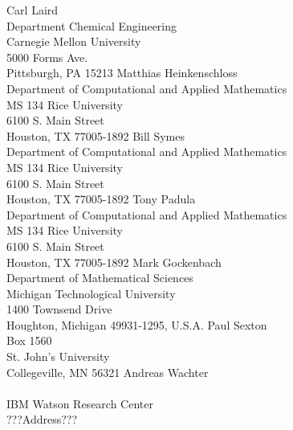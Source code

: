 \documentclass[pdf,ps2pdf,11pt]{SANDreport}
\begin{document}
\begin{SANDdistribution}
 Carl Laird \\ Department Chemical Engineering\\Carnegie Mellon University\\5000 Forms Ave.\\Pittsburgh, PA 15213
 Matthias Heinkenschloss \\ Department of Computational and Applied Mathematics\\MS 134 Rice University\\
6100 S. Main Street\\Houston, TX 77005-1892
 Bill Symes\\Department of Computational and Applied Mathematics\\MS 134 Rice University\\
6100 S. Main Street\\Houston, TX 77005-1892
 Tony Padula\\Department of Computational and Applied Mathematics\\MS 134 Rice University\\
6100 S. Main Street\\Houston, TX 77005-1892
 Mark Gockenbach \\ Department of Mathematical Sciences\\Michigan Technological University\\ 
1400 Townsend Drive\\Houghton, Michigan 49931-1295, U.S.A.
 Paul Sexton \\ Box 1560 \\ St. John's University \\ Collegeville, MN 56321
 Andreas Wachter \\  \\ IBM Watson Research Center \\
???Address???

\end{SANDdistribution}
\end{document}
